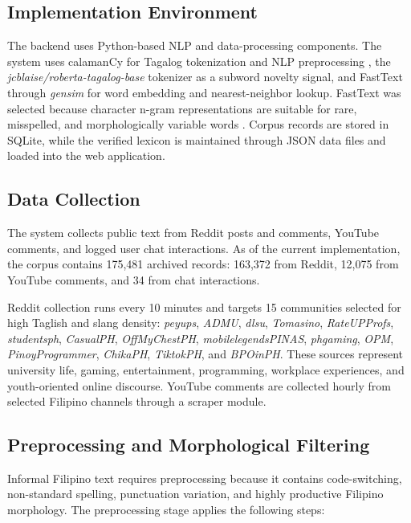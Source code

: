 \subsection{Implementation Environment}

The backend uses Python-based NLP and data-processing components. The system uses calamanCy for Tagalog tokenization and NLP preprocessing \cite{b6}, the \textit{jcblaise/roberta-tagalog-base} tokenizer as a subword novelty signal, and FastText through \textit{gensim} for word embedding and nearest-neighbor lookup. FastText was selected because character n-gram representations are suitable for rare, misspelled, and morphologically variable words \cite{b5}. Corpus records are stored in SQLite, while the verified lexicon is maintained through JSON data files and loaded into the web application.

\subsection{Data Collection}

The system collects public text from Reddit posts and comments, YouTube comments, and logged user chat interactions. As of the current implementation, the corpus contains 175,481 archived records: 163,372 from Reddit, 12,075 from YouTube comments, and 34 from chat interactions.

Reddit collection runs every 10 minutes and targets 15 communities selected for high Taglish and slang density: \textit{peyups}, \textit{ADMU}, \textit{dlsu}, \textit{Tomasino}, \textit{RateUPProfs}, \textit{studentsph}, \textit{CasualPH}, \textit{OffMyChestPH}, \textit{mobilelegendsPINAS}, \textit{phgaming}, \textit{OPM}, \textit{PinoyProgrammer}, \textit{ChikaPH}, \textit{TiktokPH}, and \textit{BPOinPH}. These sources represent university life, gaming, entertainment, programming, workplace experiences, and youth-oriented online discourse. YouTube comments are collected hourly from selected Filipino channels through a scraper module.

\subsection{Preprocessing and Morphological Filtering}

Informal Filipino text requires preprocessing because it contains code-switching, non-standard spelling, punctuation variation, and highly productive Filipino morphology. The preprocessing stage applies the following steps:

